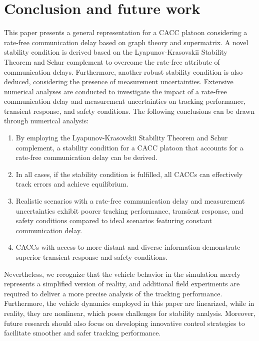 \documentclass[a4paper]{cas-sc}
\begin{document}
\section{Conclusion and future work}
\label{Section 6}

This paper presents a general representation for a CACC platoon considering a rate-free communication delay based on graph theory and supermatrix. A novel stability condition is derived based on the Lyapunov-Krasovskii Stability Theorem and Schur complement to overcome the rate-free attribute of communication delays. Furthermore, another robust stability condition is also deduced, considering the presence of measurement uncertainties. Extensive numerical analyses are conducted to investigate the impact of a rate-free communication delay and measurement uncertainties on tracking performance, transient response, and safety conditions. The following conclusions can be drawn through numerical analysis:
\begin{enumerate}
  \item By employing the Lyapunov-Krasovskii Stability Theorem and Schur complement, a stability condition for a CACC platoon that accounts for a rate-free communication delay can be derived.
  \item In all cases, if the stability condition is fulfilled, all CACCs can effectively track errors and achieve equilibrium.
  \item Realistic scenarios with a rate-free communication delay and measurement uncertainties exhibit poorer tracking performance, transient response, and safety conditions compared to ideal scenarios featuring constant communication delay.
  \item CACCs with access to more distant and diverse information demonstrate superior transient response and safety conditions.
\end{enumerate}
Nevertheless, we recognize that the vehicle behavior in the simulation merely represents a simplified version of reality, and additional field experiments are required to deliver a more precise analysis of the tracking performance. Furthermore, the vehicle dynamics employed in this paper are linearized, while in reality, they are nonlinear, which poses challenges for stability analysis. Moreover, future research should also focus on developing innovative control strategies to facilitate smoother and safer tracking performance.



\appendix
\end{document}
